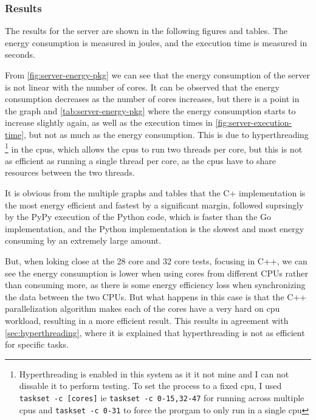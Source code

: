 \subsubsection{Results}

The results for the server are shown in the following figures and tables. The energy consumption is measured in joules, and the execution time is measured in seconds. 








From \autoref{fig:server-energy-pkg} we can see that the energy consumption of the server is not linear with the number of cores. It can be observed that the energy consumption decreases as the number of cores increases, but there is a point in the graph and \autoref{tab:server-energy-pkg} where the energy consumption starts to increase slightly again, as well as the execution times in \autoref{fig:server-execution-time}, but not as much as the energy consumption. 
This is due to hyperthreading \footnote{Hyperthreading is enabled in this system as it it not mine and I can not dissable it to perform testing. To set the process to a fixed \gls{cpu}, I used \texttt{taskset -c [cores]} ie \texttt{taskset -c 0-15,32-47} for running across multiple \glspl{cpu} and \texttt{taskset -c 0-31} to force the prorgam to only run in a single \gls{cpu}} in the \glspl{cpu}, which allows the \glspl{cpu} to run two threads per core, but this is not as efficient as running a single thread per core, as the \glspl{cpu} have to share resources between the two threads.

It is obvious from the multiple graphs and tables that the C\++ implementation is the most energy efficient and fastest by a significant margin, followed suprsingly by the PyPy execution of the Python code, which is faster than the Go implementation, and the Python implementation is the slowest and most energy consuming by an extremely large amount.

But, when loking close at the 28 core and 32 core tests, focusing in C++, we can see the energy consumption is lower when using cores from different CPUs rather than consuming more, as there is some energy efficiency loss when synchronizing the data between the two CPUs. But what happens in this case is that the C++ parallelization algorithm makes each of the cores have a very hard on \gls{cpu} workload, resulting in a more efficient result. This results in agreement with \autoref{sec:hyperthreading}, where it is explained that hyperthreading is not as efficient for specific tasks.



